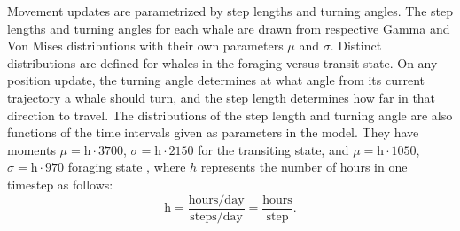 \documentclass[11pt]{article}
\begin{document}
Movement updates are parametrized by step lengths and turning angles. The step lengths and turning angles for each whale are drawn from respective Gamma and Von Mises distributions with their own parameters $\mu$ and $\sigma$. Distinct distributions are defined for whales in the foraging versus transit state. On any position update, the turning angle determines at what angle from its current trajectory a whale should turn, and the step length determines how far in that direction to travel. The distributions of the step length and turning angle are also functions of the time intervals given as parameters in the model. They have moments $\mu=\text{h} \cdot 3700$, $\sigma=\text{h} \cdot 2150$ for the transiting state, and $\mu=\text{h} \cdot 1050$, $\sigma = \text{h} \cdot 970$ foraging state \cite{Bailey}, where $h$ represents the number of hours in one timestep as follows:
\begin{equation}
     \text{h}= \frac{\text{hours}/\text{day} }{ \text{steps}/\text{day} } = \frac{\text{hours}}{\text{step}}.
     \label{eqn:h}
\end{equation}
\par


\end{document}
